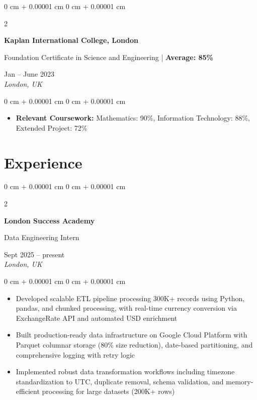 \documentclass[10pt, a4paper]{article}
\newenvironment{highlights}{
    \begin{itemize}[
        topsep=0.10 cm,
        parsep=0.10 cm,
        partopsep=0pt,
        itemsep=0pt,
        leftmargin=20pt
    ]
}{
    \end{itemize}
} %
\newenvironment{onecolentry}{
    \begin{adjustwidth}{
        0 cm + 0.00001 cm
    }{
        0 cm + 0.00001 cm
    }
}{
    \end{adjustwidth}
} %
\newenvironment{twocolentry}[2][]{
    \onecolentry
    \def\secondColumn{#2}
    \setcolumnwidth{\fill, 4.5 cm}
    \begin{paracol}{2}
}{
    \switchcolumn \raggedleft \secondColumn
    \end{paracol}
    \endonecolentry
} %
\begin{document}
    \begin{twocolentry}{
        Jan -- June 2023 \\
        \textit{London, UK}
    }
        \textbf{Kaplan International College, London}

        Foundation Certificate in Science and Engineering | \textbf{Average: 85\%}
    \end{twocolentry}

    \vspace{0.10 cm}
    \begin{onecolentry}
        \begin{highlights}
            \item \textbf{Relevant Coursework:} Mathematics: 90\%, Information Technology: 88\%, Extended Project: 72\%
        \end{highlights}
    \end{onecolentry}


    \section{Experience}

    \begin{twocolentry}{
        Sept 2025 -- present \\
        \textit{London, UK}
    }
        \textbf{London Success Academy}
        
        Data Engineering Intern
    \end{twocolentry}

    \vspace{0.10 cm}
    \begin{onecolentry}
        \begin{highlights}
            \item Developed scalable ETL pipeline processing 300K+ records using Python, pandas, and chunked processing, with real-time currency conversion via ExchangeRate API and automated USD enrichment
            \item Built production-ready data infrastructure on Google Cloud Platform with Parquet columnar storage (80\% size reduction), date-based partitioning, and comprehensive logging with retry logic
            \item Implemented robust data transformation workflows including timezone standardization to UTC, duplicate removal, schema validation, and memory-efficient processing for large datasets (200K+ rows)
        \end{highlights}
    \end{onecolentry}
\end{document}
